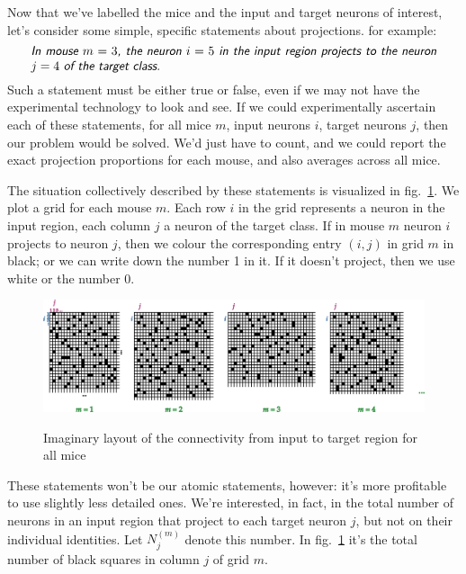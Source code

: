 \documentclass[\ifafour a4paper,12pt,\else a5paper,10pt,\fi%
onecolumn,oneside,article,%
british%
]{memoir}
\theoremstyle{remark}
\theoremstyle{innote}
\renewcommand*{\|}[1][]{\nonscript\,#1\vert\nonscript\;\mathopen{}}
\newcommand*{\fig}{fig.}%
\newcommand*{\statm}[1]{\textsl{\textsf{#1}}}
\newcommand*{\yNm}[1][m]{N^{(#1)}}
\begin{document}
\medskip


Now that we've labelled the mice and the input and target neurons of
interest, let's consider some simple, specific statements about
projections. for example:
\[\parbox{0.95\linewidth}{\statm{In mouse $m=3$, the neuron $i=5$ in the input
      region projects to the neuron $j=4$ of the target class.}}\]
Such a statement must be either true or false, even if we may not have the
experimental technology to look and see. If we could experimentally
ascertain each of these statements, for all mice $m$, input neurons $i$,
target neurons $j$, then our problem would be solved. We'd just have to
count, and we could report the exact projection proportions for each mouse,
and also averages across all mice.

The situation collectively described by these statements is visualized in
\fig~\ref{fig:cmij}. We plot a grid for each mouse $m$. Each row $i$ in the
grid represents a neuron in the input region, each column $j$ a neuron of
the target class. If in mouse $m$ neuron $i$ projects to neuron $j$, then
we colour the corresponding entry $(i,j)$ in grid $m$ in black; or we can
write down the number 1 in it. If it doesn't project, then we use white or
the number 0.
\begin{figure}[t!]%
 \centering\includegraphics[width=\linewidth]{bente_notes_drawings.png}\\
 \caption{Imaginary layout of the connectivity from input to target region
   for all mice}\label{fig:cmij}
\end{figure}%

\medskip

These statements won't be our atomic statements, however: it's more
profitable to use slightly less detailed ones. We're interested, in fact,
in the total number of neurons in an input region that project to each
target neuron $j$, but not on their individual identities. Let $\yNm_{j}$
denote this number. In \fig~\ref{fig:cmij} it's the total number of black
squares in column $j$ of grid $m$.
\end{document}
